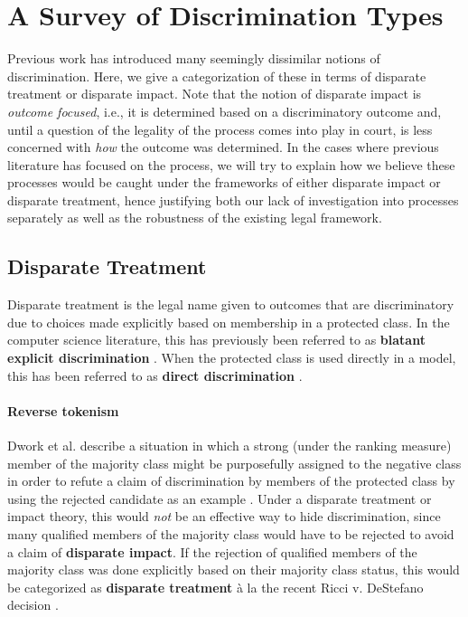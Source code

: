 \appendix

\section{A Survey of Discrimination Types}
Previous work has introduced many seemingly dissimilar notions of discrimination.  Here, we give a categorization of these in terms of disparate treatment or disparate impact.  Note that the notion of disparate impact is \emph{outcome focused}, i.e., it is determined based on a discriminatory outcome and, until a question of the legality of the process comes into play in court, is less concerned with \emph{how} the outcome was determined.  In the cases where previous literature has focused on the process, we will try to explain how we believe these processes would be caught under the frameworks of either disparate impact or disparate treatment, hence justifying both our lack of investigation into processes separately as well as the robustness of the existing legal framework.

\subsection{Disparate Treatment}

Disparate treatment is the legal name given to outcomes that are discriminatory due to choices made explicitly based on membership in a protected class.  In the computer science literature, this has previously been referred to as \textbf{blatant explicit discrimination} \cite{Dwork12Fairness}.  When the protected class is used directly in a model, this has been referred to as \textbf{direct discrimination} \cite{Kamishima12Fairness}.

\paragraph{Reverse tokenism}  Dwork et al. describe a situation in which a strong (under the ranking measure) member of the majority class might be purposefully assigned to the negative class in order to refute a claim of discrimination by members of the protected class by using the rejected candidate as an example \cite{Dwork12Fairness}.  Under a disparate treatment or impact theory, this would \emph{not} be an effective way to hide discrimination, since many qualified members of the majority class would have to be rejected to avoid a claim of \textbf{disparate impact}.  If the rejection of qualified members of the majority class was done explicitly based on their majority class status, this would be categorized as \textbf{disparate treatment} \`{a} la the recent Ricci v. DeStefano decision \cite{Ricci09}.

